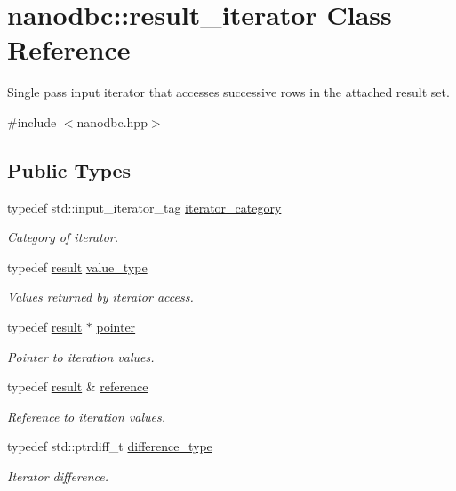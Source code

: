\hypertarget{classnanodbc_1_1result__iterator}{}\section{nanodbc\+::result\+\_\+iterator Class Reference}
\label{classnanodbc_1_1result__iterator}


Single pass input iterator that accesses successive rows in the attached result set.  




{\ttfamily \#include $<$nanodbc.\+hpp$>$}

\subsection*{Public Types}
\begin{DoxyCompactItemize}
\item 
typedef std\+::input\+\_\+iterator\+\_\+tag \mbox{\hyperlink{classnanodbc_1_1result__iterator_af46c41cf24ac2db0574486dc2b88c848}{iterator\+\_\+category}}
\begin{DoxyCompactList}\small\item\em Category of iterator. \end{DoxyCompactList}\item 
typedef \mbox{\hyperlink{classnanodbc_1_1result}{result}} \mbox{\hyperlink{classnanodbc_1_1result__iterator_a70c5112a23653e61cfd840631f5a370e}{value\+\_\+type}}
\begin{DoxyCompactList}\small\item\em Values returned by iterator access. \end{DoxyCompactList}\item 
typedef \mbox{\hyperlink{classnanodbc_1_1result}{result}} $\ast$ \mbox{\hyperlink{classnanodbc_1_1result__iterator_a49329c62a4366740ff86be23ca1eef0d}{pointer}}
\begin{DoxyCompactList}\small\item\em Pointer to iteration values. \end{DoxyCompactList}\item 
typedef \mbox{\hyperlink{classnanodbc_1_1result}{result}} \& \mbox{\hyperlink{classnanodbc_1_1result__iterator_aeca21fe535e223231562d96a76c5ee92}{reference}}
\begin{DoxyCompactList}\small\item\em Reference to iteration values. \end{DoxyCompactList}\item 
typedef std\+::ptrdiff\+\_\+t \mbox{\hyperlink{classnanodbc_1_1result__iterator_af16f09f398c533c9346d521a2ea9aeef}{difference\+\_\+type}}
\begin{DoxyCompactList}\small\item\em Iterator difference. \end{DoxyCompactList}\end{DoxyCompactItemize}
